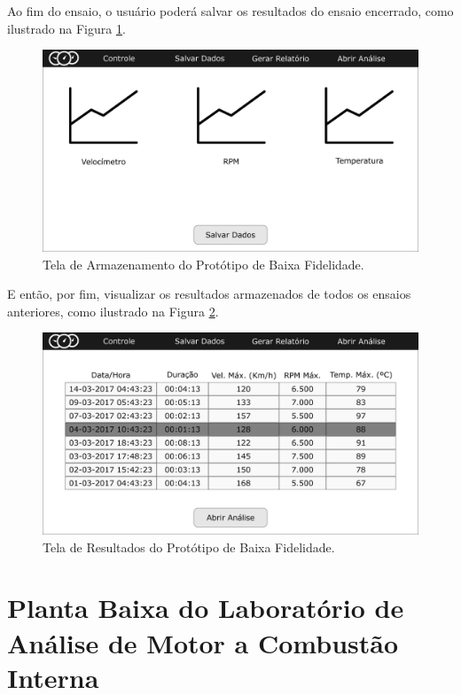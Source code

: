 \begin{anexosenv}
Ao fim do ensaio, o usuário poderá salvar os resultados do ensaio encerrado, como ilustrado na Figura \ref{fig:telasalvardados}.

\begin{figure}[h!]
	\centering
	\includegraphics[keepaspectratio=true,scale= 0.23]{figuras/telasalvardados.png}
	\caption{Tela de Armazenamento do Protótipo de Baixa Fidelidade.}
	\label{fig:telasalvardados}
\end{figure}

E então, por fim, visualizar os resultados armazenados de todos os ensaios anteriores, como ilustrado na Figura \ref{fig:telaresultados}.

\begin{figure}[h!]
	\centering
	\includegraphics[keepaspectratio=true,scale= 0.23]{figuras/telaresultados.png}
	\caption{Tela de Resultados do Protótipo de Baixa Fidelidade.}
	\label{fig:telaresultados}
\end{figure}

\chapter{Planta Baixa do Laboratório de Análise de Motor a Combustão Interna}


\end{anexosenv}
